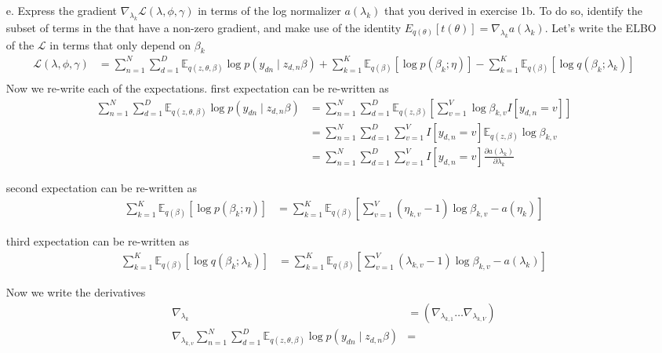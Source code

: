 \documentclass [12pt]{article}
\newcommand{\E}{\ensuremath{\mathbb{E}}}
\begin{document}
\begin{itemize}
\item[e.] Express the gradient $\nabla_{\lambda_k} \mathcal{L}(\lambda, \phi, \gamma)$ in terms of the log normalizer
    $a(\lambda_k)$ that you derived in exercise 1b. To do so, identify the subset of terms in the that have a non-zero
    gradient, and make use of the identity $E_{q(\theta)}[t(\theta)] = \nabla_{\lambda_k} a(\lambda_k)$. 
Let's write the ELBO of the $ \mathcal{L}$ in terms that only depend on $\beta_k$
\begin{align*}
    \mathcal{L}(\lambda, \phi, \gamma) &= \sum_{n=1}^N \sum_{d=1}^D \E_{q(z, \theta, \beta)}{ \log p(y_{dn} \mid z_{d,n} \beta)}  + \sum_{k=1}^K\E_{q(\beta)} \left[\log p(\beta_k ; \eta)\right] - \sum_{k=1}^K\E_{q(\beta)} \left[\log q(\beta_k ; \lambda_k)\right] \\
\end{align*}
Now we re-write each of the expectations.
first expectation can be re-written as
\begin{align*}
    \sum_{n=1}^N \sum_{d=1}^D \E_{q(z, \theta, \beta)}{ \log p(y_{dn} \mid z_{d,n} \beta)} &= \sum^N_{n=1} \sum^D_{d=1} \E_{q(z, \beta)}\left[ \sum^V_{v=1} \log \beta_{k,v} I[y_{d,n} = v] \right] \\
    &= \sum_{n=1}^{N} \sum_{d=1}^D
\sum_{v=1}^V I[y_{d,n} = v] \E_{q(z, \beta)} \log \beta_{k,v}  \\
    &= \sum_{n=1}^{N} \sum_{d=1}^D
    \sum_{v=1}^V I[y_{d,n} = v] \frac{\partial a(\lambda_k)}{\partial \lambda_k}
\end{align*}

second expectation can be re-written as
\begin{align*}
    \sum_{k=1}^K\E_{q(\beta)} \left[\log p(\beta_k ; \eta)\right] &= \sum_{k=1}^K \E_{q(\beta)} \left[\sum_{v=1}^V (\eta_{k,v} -1) \log \beta_{k,v} - a(\eta_k) \right]
\end{align*}

third expectation can be re-written as
\begin{align*}
    \sum_{k=1}^K\E_{q(\beta)} \left[\log q(\beta_k ; \lambda_k)\right] &= \sum_{k=1}^K \E_{q(\beta)}\left[ \sum_{v=1}^V (\lambda_{k,v} -1) \log \beta_{k,v} - a(\lambda_k)\right]
\end{align*}

Now we write the derivatives 
\begin{align*}
    \nabla_{\lambda_k} &= \left( \nabla_{\lambda_{k,1}} \dots \nabla_{\lambda_{k,V}} \right) \\
    \nabla_{\lambda_{k,v}} \sum_{n=1}^N \sum_{d=1}^D \E_{q(z, \theta, \beta)}{ \log p(y_{dn} \mid z_{d,n} \beta)} &= 
\end{align*}





\end{itemize}
\end{document}
